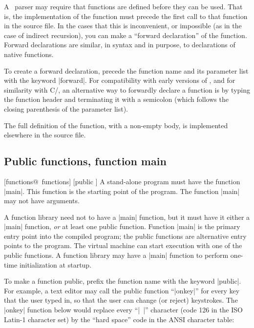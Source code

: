 A \Small\ parser may require that functions are defined before they can be used.
That is, the implementation of the function must precede the first call to
that function in the source file. In the cases that this is inconvenient, or
impossible (as in the case of indirect recursion), you can make a ``forward
declaration'' of the function.
Forward declarations are similar, in syntax and in purpose, to declarations of
native functions.

To create a forward declaration, precede the function name and its parameter
list with the keyword |forward|. For compatibility with early versions of \Small,
and for similarity with C/\Cpp, an alternative way to forwardly declare a
function is by typing the function header and terminating it with a semicolon
(which follows the closing parenthesis of the parameter list).

The full definition of the function, with a non-empty body, is implemented
elsewhere in the source file.

\subsection{Public functions, function main}
 [functions@\midtilde\ functions] [public \midtilde]
A stand-alone program must have the function |main|. This function is the
starting point of the program. The function |main| may not have arguments.

A function library need not to have a |main| function, but it must have
{it either\/} a |main| function, {\it or\/} at least one public function.
Function |main| is the primary entry point into the compiled program; the
public functions are alternative entry points to the program. The virtual
machine can start execution with one of the public functions. A function
library may have a |main| function to perform one-time initialization at
startup.

To make a function public, prefix the function name with the keyword |public|.
For example, a text editor may call the public function ``|onkey|'' for every
key that the user typed in, so that the user can change (or reject) keystrokes.
The |onkey| function below would replace every ``|~|'' character (code 126
in the ISO Latin-1 character set) by the ``hard space'' code in the
ANSI character table:

